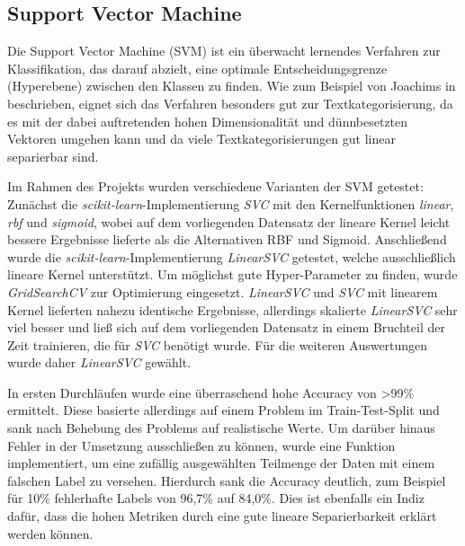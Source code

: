 \subsection{Support Vector Machine}
\label{SVM}

Die Support Vector Machine (SVM) ist ein überwacht lernendes Verfahren zur Klassifikation, das darauf abzielt, eine optimale Entscheidungsgrenze (Hyperebene) zwischen den Klassen zu finden. Wie zum Beispiel von Joachims in \cite{textCategorizationWithSVM} beschrieben, eignet sich das Verfahren besonders gut zur Textkategorisierung, da es mit der dabei auftretenden hohen Dimensionalität und dünnbesetzten Vektoren umgehen kann und da viele Textkategorisierungen gut linear separierbar sind.

Im Rahmen des Projekts wurden verschiedene Varianten der SVM getestet: Zunächst die \textit{scikit-learn}-Implementierung \textit{SVC} mit den Kernelfunktionen \textit{linear}, \textit{rbf} und \textit{sigmoid}, wobei auf dem vorliegenden Datensatz der lineare Kernel leicht bessere Ergebnisse lieferte als die Alternativen RBF und Sigmoid. Anschließend wurde die \textit{scikit-learn}-Implementierung \textit{LinearSVC} getestet, welche ausschließlich lineare Kernel unterstützt.  Um möglichst gute Hyper-Parameter zu finden, wurde \textit{GridSearchCV} zur Optimierung eingesetzt. \textit{LinearSVC} und \textit{SVC} mit linearem Kernel lieferten nahezu identische Ergebnisse, allerdings skalierte \textit{LinearSVC} sehr viel besser und ließ sich auf dem vorliegenden Datensatz in einem Bruchteil der Zeit trainieren, die für \textit{SVC} benötigt wurde. Für die weiteren Auswertungen wurde daher \textit{LinearSVC} gewählt.

In ersten Durchläufen wurde eine überraschend hohe Accuracy von >99\% ermittelt. Diese basierte allerdings auf einem Problem im Train-Test-Split und sank nach Behebung des Problems auf realistische Werte. Um darüber hinaus Fehler in der Umsetzung ausschließen zu können, wurde eine Funktion implementiert, um eine zufällig ausgewählten Teilmenge der Daten mit einem falschen Label zu versehen. Hierdurch sank die Accuracy deutlich, zum Beispiel für 10\% fehlerhafte Labels von 96,7\% auf 84,0\%. Dies ist ebenfalls ein Indiz dafür, dass die hohen Metriken durch eine gute lineare Separierbarkeit erklärt werden können.
